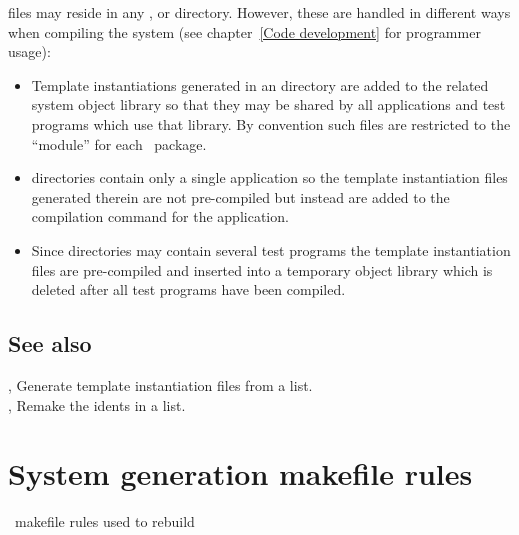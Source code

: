  files may reside in any ,  or 
directory.  However, these are handled in different ways when compiling the
system (see chapter~\ref{Code development} for programmer usage):
\begin{itemize}
\item
   Template instantiations generated in an  directory are
   added to the related system object library so that they may be shared by
   all applications and test programs which use that library.  By convention
   such  files are restricted to the 
   ``module'' for each \aipspp\ package.
\item
    directories contain only a single application so the template
   instantiation files generated therein are not pre-compiled but instead are
   added to the compilation command for the application.
\item
   Since  directories may contain several test programs the template
   instantiation files are pre-compiled and inserted into a temporary object
   library which is deleted after all test programs have been compiled.
\end{itemize}
 
\subsection*{See also}
 
, Generate template instantiation files from a list.\\
, Remake the idents in a  list.

 
\newpage
\section{System generation makefile rules}
\label{System generation makefile rules}
 
\gnu\ makefile rules used to rebuild \aipspp
 
